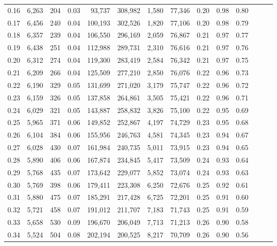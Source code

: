 \begin{tabular}{rrrrrrrrrrrrrr}
0.16 &  6,263 &    204 &  0.03 &   93,737 &  308,982 &   1,580 &  77,346 &  0.20 &  0.98 &      0.80 \\
0.17 &  6,456 &    240 &  0.04 &  100,193 &  302,526 &   1,820 &  77,106 &  0.20 &  0.98 &      0.79 \\
0.18 &  6,357 &    239 &  0.04 &  106,550 &  296,169 &   2,059 &  76,867 &  0.21 &  0.97 &      0.77 \\
0.19 &  6,438 &    251 &  0.04 &  112,988 &  289,731 &   2,310 &  76,616 &  0.21 &  0.97 &      0.76 \\
0.20 &  6,312 &    274 &  0.04 &  119,300 &  283,419 &   2,584 &  76,342 &  0.21 &  0.97 &      0.75 \\
0.21 &  6,209 &    266 &  0.04 &  125,509 &  277,210 &   2,850 &  76,076 &  0.22 &  0.96 &      0.73 \\
0.22 &  6,190 &    329 &  0.05 &  131,699 &  271,020 &   3,179 &  75,747 &  0.22 &  0.96 &      0.72 \\
0.23 &  6,159 &    326 &  0.05 &  137,858 &  264,861 &   3,505 &  75,421 &  0.22 &  0.96 &      0.71 \\
0.24 &  6,029 &    321 &  0.05 &  143,887 &  258,832 &   3,826 &  75,100 &  0.22 &  0.95 &      0.69 \\
0.25 &  5,965 &    371 &  0.06 &  149,852 &  252,867 &   4,197 &  74,729 &  0.23 &  0.95 &      0.68 \\
0.26 &  6,104 &    384 &  0.06 &  155,956 &  246,763 &   4,581 &  74,345 &  0.23 &  0.94 &      0.67 \\
0.27 &  6,028 &    430 &  0.07 &  161,984 &  240,735 &   5,011 &  73,915 &  0.23 &  0.94 &      0.65 \\
0.28 &  5,890 &    406 &  0.06 &  167,874 &  234,845 &   5,417 &  73,509 &  0.24 &  0.93 &      0.64 \\
0.29 &  5,768 &    435 &  0.07 &  173,642 &  229,077 &   5,852 &  73,074 &  0.24 &  0.93 &      0.63 \\
0.30 &  5,769 &    398 &  0.06 &  179,411 &  223,308 &   6,250 &  72,676 &  0.25 &  0.92 &      0.61 \\
0.31 &  5,880 &    475 &  0.07 &  185,291 &  217,428 &   6,725 &  72,201 &  0.25 &  0.91 &      0.60 \\
0.32 &  5,721 &    458 &  0.07 &  191,012 &  211,707 &   7,183 &  71,743 &  0.25 &  0.91 &      0.59 \\
0.33 &  5,658 &    530 &  0.09 &  196,670 &  206,049 &   7,713 &  71,213 &  0.26 &  0.90 &      0.58 \\
0.34 &  5,524 &    504 &  0.08 &  202,194 &  200,525 &   8,217 &  70,709 &  0.26 &  0.90 &      0.56 \\

\end{tabular}
